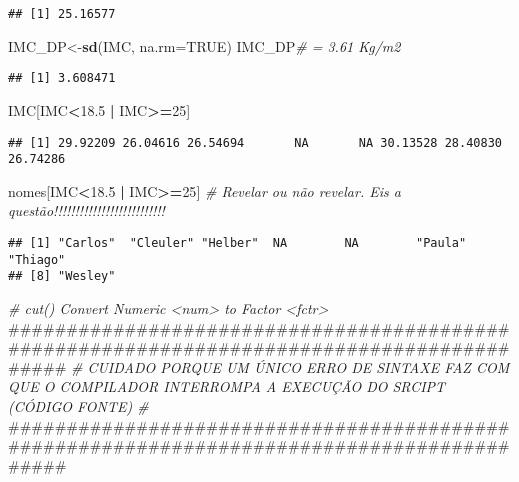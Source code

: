\documentclass[]{article}
\newenvironment{Shaded}{\begin{snugshade}}{\end{snugshade}}
\newcommand{\KeywordTok}[1]{\textcolor[rgb]{0.13,0.29,0.53}{\textbf{#1}}}
\newcommand{\DataTypeTok}[1]{\textcolor[rgb]{0.13,0.29,0.53}{#1}}
\newcommand{\DecValTok}[1]{\textcolor[rgb]{0.00,0.00,0.81}{#1}}
\newcommand{\FloatTok}[1]{\textcolor[rgb]{0.00,0.00,0.81}{#1}}
\newcommand{\StringTok}[1]{\textcolor[rgb]{0.31,0.60,0.02}{#1}}
\newcommand{\CommentTok}[1]{\textcolor[rgb]{0.56,0.35,0.01}{\textit{#1}}}
\newcommand{\OtherTok}[1]{\textcolor[rgb]{0.56,0.35,0.01}{#1}}
\newcommand{\OperatorTok}[1]{\textcolor[rgb]{0.81,0.36,0.00}{\textbf{#1}}}
\newcommand{\NormalTok}[1]{#1}
\begin{document}
\begin{verbatim}
## [1] 25.16577
\end{verbatim}

\begin{Shaded}
\begin{Highlighting}[]
\NormalTok{IMC_DP<-}\KeywordTok{sd}\NormalTok{(IMC, }\DataTypeTok{na.rm=}\OtherTok{TRUE}\NormalTok{)}
\NormalTok{IMC_DP}\CommentTok{# =  3.61 Kg/m2}
\end{Highlighting}
\end{Shaded}

\begin{verbatim}
## [1] 3.608471
\end{verbatim}

\begin{Shaded}
\begin{Highlighting}[]
\NormalTok{IMC[IMC}\OperatorTok{<}\FloatTok{18.5} \OperatorTok{|}\StringTok{ }\NormalTok{IMC}\OperatorTok{>=}\DecValTok{25}\NormalTok{]}
\end{Highlighting}
\end{Shaded}

\begin{verbatim}
## [1] 29.92209 26.04616 26.54694       NA       NA 30.13528 28.40830 26.74286
\end{verbatim}

\begin{Shaded}
\begin{Highlighting}[]
\NormalTok{nomes[IMC}\OperatorTok{<}\FloatTok{18.5} \OperatorTok{|}\StringTok{ }\NormalTok{IMC}\OperatorTok{>=}\DecValTok{25}\NormalTok{] }\CommentTok{# Revelar ou não revelar. Eis a questão!!!!!!!!!!!!!!!!!!!!!!!!!!}
\end{Highlighting}
\end{Shaded}

\begin{verbatim}
## [1] "Carlos"  "Cleuler" "Helber"  NA        NA        "Paula"   "Thiago" 
## [8] "Wesley"
\end{verbatim}

\begin{Shaded}
\begin{Highlighting}[]
\CommentTok{# cut() Convert Numeric <num> to Factor <fctr>}
\NormalTok{###########################################################################################}
\CommentTok{# CUIDADO PORQUE UM ÚNICO ERRO DE SINTAXE FAZ COM QUE O COMPILADOR INTERROMPA A EXECUÇÃO DO SRCIPT (CÓDIGO FONTE)  #}
\NormalTok{###########################################################################################}
\end{Highlighting}
\end{Shaded}
\end{document}
